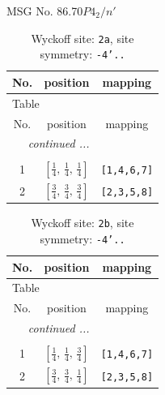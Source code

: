 \documentclass[fleqn,8pt]{jsarticle}
\begin{document}
\setcounter{MaxMatrixCols}{32}

\renewcommand{\tablename}{Table~}
\renewcommand{\figurename}{Figure~}
\begin{center}
\LARGE
MSG No. 86.70\quad$P4_{2}/n'$
\end{center}
\renewcommand{\arraystretch}{1.2}
\begin{longtable}{ccc}
\caption{Wyckoff site: {\tt 2a}, site symmetry: {\tt -4'..}}
 \\
 \hline \hline
No. & position & mapping \\ \hline \endfirsthead

\multicolumn{2}{l}{\tablename\ \thetable{}} \\
 \hline \hline
No. & position & mapping \\ \hline \endhead

 \hline \hline
\multicolumn{2}{r}{\footnotesize\it continued ...} \\ \endfoot

 \hline \hline
\multicolumn{2}{r}{} \\ \endlastfoot

1 & $\left[ \frac{1}{4},\, \frac{1}{4},\, \frac{1}{4} \right]$ & {\tt [1,4,6,7]} \\ \hline
2 & $\left[ \frac{3}{4},\, \frac{3}{4},\, \frac{3}{4} \right]$ & {\tt [2,3,5,8]} \\
\end{longtable}
\renewcommand{\arraystretch}{1.2}
\begin{longtable}{ccc}
\caption{Wyckoff site: {\tt 2b}, site symmetry: {\tt -4'..}}
 \\
 \hline \hline
No. & position & mapping \\ \hline \endfirsthead

\multicolumn{2}{l}{\tablename\ \thetable{}} \\
 \hline \hline
No. & position & mapping \\ \hline \endhead

 \hline \hline
\multicolumn{2}{r}{\footnotesize\it continued ...} \\ \endfoot

 \hline \hline
\multicolumn{2}{r}{} \\ \endlastfoot

1 & $\left[ \frac{1}{4},\, \frac{1}{4},\, \frac{3}{4} \right]$ & {\tt [1,4,6,7]} \\ \hline
2 & $\left[ \frac{3}{4},\, \frac{3}{4},\, \frac{1}{4} \right]$ & {\tt [2,3,5,8]} \\
\end{longtable}
\end{document}
